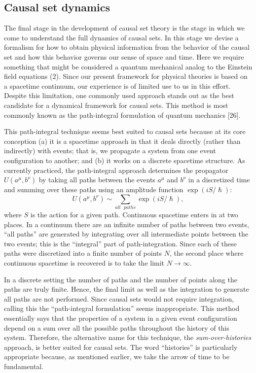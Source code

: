 \subsection{Causal set dynamics}

The final stage in the development of causal set theory is the stage in
which we come to understand the full dynamics of causal sets. In this stage
we devise a formalism for how to obtain physical information from the
behavior of the causal set and how this behavior governs our sense of space
and time. Here we require something that might be considered a quantum
mechanical analog to the Einstein field equations (2). Since our present
framework for physical theories is based on a spacetime continuum, our
experience is of limited use to us in this effort. Despite this limitation,
one commonly used approach stands out as the best candidate for a dynamical
framework for causal sets. This method is most commonly known as the
path-integral formulation of quantum mechanics [26].

This path-integral technique seems best suited to causal sets because at its
core conception (a) it is a spacetime approach in that it deals directly
(rather than indirectly) with events; that is, we propagate a system from
one event configuration to another; and (b) it works on a discrete spacetime
structure. As currently practiced, the path-integral approach determines the
propagator $U(a^{\mu {}},b^{\nu {}})$ by taking all paths between the events 
$a^{\mu {}}$ and $b^{\nu {}}$ in a discretized time and summing over these
paths using an amplitude function $\exp (iS/\hslash )$: 
\begin{equation}
U(a^{\mu {}},b^{\nu {}})\sim \sum_{all\text{ }paths}\exp (iS/\hslash ),
\label{3}
\end{equation}
where $S$ is the action for a given path. Continuous spacetime enters in at
two places. In a continuum there are an infinite number of paths between two
events, ``all paths'' are generated by integrating over all intermediate
points between the two events; this is the ``integral'' part of
path-integration. Since each of these paths were discretized into a finite
number of points $N$, the second place where continuous spacetime is
recovered is to take the limit $N\rightarrow \infty $.

In a discrete setting the number of paths and the number of points along the
paths are truly finite. Hence, the final limit as well as the integration to
generate all paths are not performed. Since causal sets would not require
integration, calling this the ``path-integral formulation'' seems
inappropriate. This method essentially says that the properties of a system
in a given event configuration depend on a sum over all the possible paths
throughout the history of this system. Therefore, the alternative name for
this technique, the {\it sum-over-histories} approach, is better suited for
causal sets. The word ``histories'' is particularly appropriate because, as
mentioned earlier, we take the arrow of time to be fundamental.

